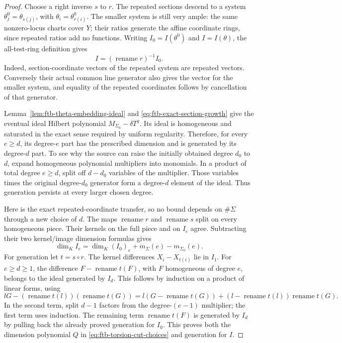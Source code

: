 \begin{proof}
Choose a right inverse \(s\) to \(r\).
The repeated sections descend to a system
\(\theta^0_j=\theta_{s(j)}\), with
\(\theta_i=\theta^0_{r(i)}\).
The smaller system is still very ample: the same
nonzero-locus charts cover \(Y\); their ratios generate
the affine coordinate rings, since repeated ratios add
no functions.
Writing \(I_0=I(\theta^0)\) and \(I=I(\theta)\), the
all-test-ring definition gives
\[
                  I=(\operatorname{rename}r)^{-1}I_0.
 \tag{TF7}\label{eq:ftb-repeated-coordinate-ideal}
\]
Indeed, section-coordinate vectors of the repeated
system are repeated vectors.
Conversely their actual common line generator also
gives the vector for the smaller system, and equality
of the repeated coordinates follows by cancellation
of that generator.

Lemma~\ref{lem:ftb-theta-embedding-ideal} and
\eqref{eq:ftb-exact-section-growth} give the eventual
ideal Hilbert polynomial
\(M_{\Sigma_0}-\delta T^g\).
Its ideal is homogeneous and saturated in the exact
sense required by uniform regularity.
Therefore, for every \(e\ge d\), its degree-\(e\)
part has the prescribed dimension and is generated by
its degree-\(d\) part.
To see why the source can raise the initially obtained
degree \(d_0\) to \(d\), expand homogeneous polynomial
multipliers into monomials.
In a product of total degree \(e\ge d\), split off
\(d-d_0\) variables of the multiplier.
Those variables times the original degree-\(d_0\)
generator form a degree-\(d\) element of the ideal.
Thus generation persists at every larger chosen degree.

Here is the exact repeated-coordinate transfer, so no
bound depends on \(\#\Sigma\) through a new choice of
\(d\).
The maps \(\operatorname{rename}r\) and
\(\operatorname{rename}s\) split on every homogeneous
piece.
Their kernels on the full piece and on \(I_e\) agree.
Subtracting their two kernel/image dimension formulas
gives
\[
                    \dim_K I_e
                  =\dim_K(I_0)_e+m_\Sigma(e)-m_{\Sigma_0}(e).
 \tag{TF8}\label{eq:ftb-repeated-coordinate-dimension}
\]
For generation let \(t=s\circ r\).
The kernel differences \(X_i-X_{t(i)}\) lie in \(I_1\).
For \(e\ge d\ge1\), the difference
\(F-\operatorname{rename}t(F)\), with \(F\) homogeneous
of degree \(e\), belongs to the ideal generated by \(I_d\).
This follows by induction on a product of linear
forms, using
\[
 lG-(\operatorname{rename}t(l))
              (\operatorname{rename}t(G))
 =l(G-\operatorname{rename}t(G))
  +(l-\operatorname{rename}t(l))\operatorname{rename}t(G).
\]
In the second term, split \(d-1\) factors from the
degree-\((e-1)\) multiplier; the first term uses
induction.
The remaining term
\(\operatorname{rename}t(F)\) is generated by \(I_d\)
by pulling back the already proved generation for \(I_0\).
This proves both the dimension polynomial \(Q\) in
\eqref{eq:ftb-torsion-cut-choices} and generation for \(I\).


\end{proof}
